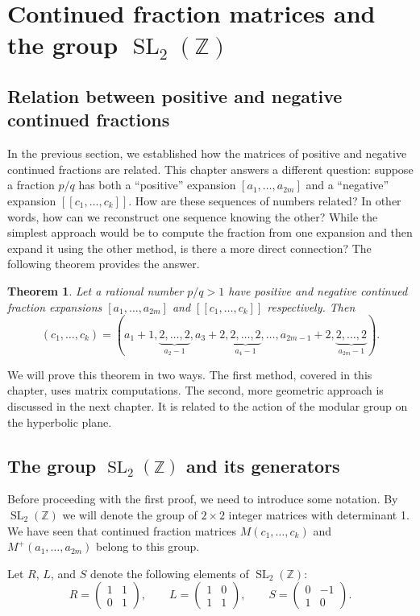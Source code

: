\documentclass[a4paper,11pt]{amsart}
\newcommand{\ZZ}{{\mathbb{Z}}}
\newcommand{\SL}{\mathop{\mathrm{SL}}}
\theoremstyle{plain}
\newtheorem{theorem}{Theorem}[section]
\theoremstyle{remark}
\theoremstyle{definition}
\numberwithin{equation}{section}
\numberwithin{figure}{section}
\begin{document}


\section{Continued fraction matrices and the group $\SL_2(\ZZ)$}

\subsection{Relation between positive and negative continued fractions}

In the previous section, we established how the matrices of positive and negative continued fractions are related. This chapter answers a different question: suppose a fraction $p/q$ has both a ``positive'' expansion $[a_1,\dots,a_{2m}]$ and a ``negative'' expansion $[[c_1,\dots,c_k]]$. How are these sequences of numbers related? In other words, how can we reconstruct one sequence knowing the other? While the simplest approach would be to compute the fraction from one expansion and then expand it using the other method, is there a more direct connection? The following theorem provides the answer.

\begin{theorem}\label{thm:hirz} Let a rational number $p/q>1$ have positive and negative continued fraction expansions $[a_1,\dots,a_{2m}]$ and $[[c_1,\dots,c_k]]$ respectively. Then 
\[
(c_1,\dots,c_k)=(a_1+1,\underbrace{2,\dots,2}_{a_2-1},a_3+2,\underbrace{2,\dots,2}_{a_4-1},\dots,a_{2m-1}+2,\underbrace{2,\dots,2}_{a_{2m}-1}).
\]
\end{theorem}

We will prove this theorem in two ways. The first method, covered in this chapter, uses matrix computations. The second, more geometric approach is discussed in the next chapter. It is related to the action of the modular group on the hyperbolic plane.

\subsection{The group $\SL_2(\ZZ)$ and its generators}\label{ssec:sl2z}

Before proceeding with the first proof, we need to introduce some notation. By $\SL_2(\ZZ)$ we will denote the group of $2\times 2$ integer matrices with determinant 1. We have seen that continued fraction matrices $M(c_1,\dots,c_k)$ and $M^+(a_1,\dots,a_{2m})$ belong to this group.

Let $R$, $L$, and $S$ denote the following elements of $\SL_2(\ZZ)$:
\[
R=\begin{pmatrix}1 & 1\\ 0 &1
\end{pmatrix},\qquad
L=\begin{pmatrix}1 & 0\\ 1 &1
\end{pmatrix},\qquad
S=\begin{pmatrix}0 & -1\\ 1 &0
\end{pmatrix}.
\]
\end{document}

